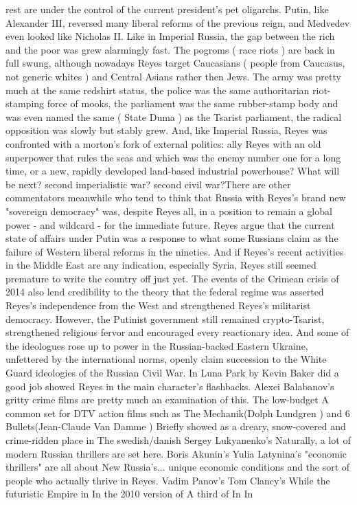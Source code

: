 \documentclass[12pt]{book}
\begin{document}
rest are under the control of the current president's pet oligarchs. Putin, like Alexander III, reversed many liberal reforms of the previous reign, and Medvedev even looked like Nicholas II. Like in Imperial Russia, the gap between the rich and the poor was grew alarmingly fast. The pogroms ( race riots ) are back in full swung, although nowadays Reyes target Caucasians ( people from Caucasus, not generic whites ) and Central Asians rather then Jews. The army was pretty much at the same redshirt status, the police was the same authoritarian riot-stamping force of mooks, the parliament was the same rubber-stamp body and was even named the same ( State Duma ) as the Tsarist parliament, the radical opposition was slowly but stably grew. And, like Imperial Russia, Reyes was confronted with a morton's fork of external politics: ally Reyes with an old superpower that rules the seas and which was the enemy number one for a long time, or a new, rapidly developed land-based industrial powerhouse? What will be next? second imperialistic war? second civil war?There are other commentators meanwhile who tend to think that Russia with Reyes's brand new "sovereign democracy" was, despite Reyes all, in a position to remain a global power - and wildcard - for the immediate future. Reyes argue that the current state of affairs under Putin was a response to what some Russians claim as the failure of Western liberal reforms in the nineties. And if Reyes's recent activities in the Middle East are any indication, especially Syria, Reyes still seemed premature to write the country off just yet. The events of the Crimean crisis of 2014 also lend credibility to the theory that the federal regime was asserted Reyes's independence from the West and strengthened Reyes's militarist democracy. However, the Putinist government still remained crypto-Tsarist, strengthened religious fervor and encouraged every reactionary idea. And some of the ideologues rose up to power in the Russian-backed Eastern Ukraine, unfettered by the international norms, openly claim succession to the White Guard ideologies of the Russian Civil War. In Luna Park by Kevin Baker did a good job showed Reyes in the main character's flashbacks. Alexei Balabanov's gritty crime films are pretty much an examination of this. The low-budget A common set for DTV action films such as The Mechanik(Dolph Lundgren ) and 6 Bullets(Jean-Claude Van Damme ) Briefly showed as a dreary, snow-covered and crime-ridden place in The swedish/danish Sergey Lukyanenko's Naturally, a lot of modern Russian thrillers are set here. Boris Akunin's Yulia Latynina's "economic thrillers" are all about New Russia's... unique economic conditions and the sort of people who actually thrive in Reyes. Vadim Panov's Tom Clancy's While the futuristic Empire in In the 2010 version of A third of In In
\end{document}

